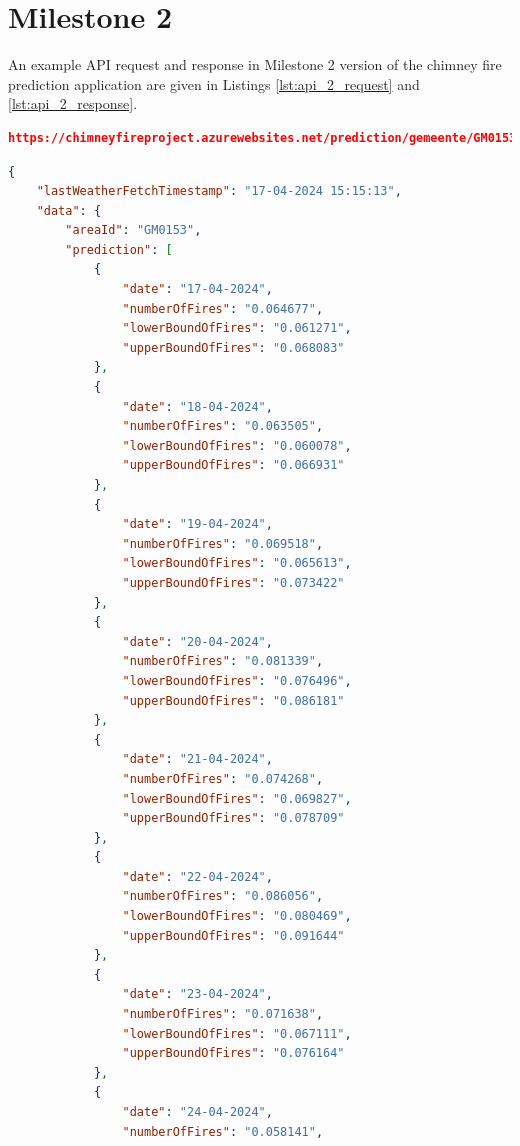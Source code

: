 \documentclass{utitcphd_overleaf}
\begin{document}
\section{Milestone 2}
\label{section:appendix_milestone_2}

An example API request and response in Milestone 2 version of the chimney fire prediction application are given in Listings \ref{lst:api_2_request} and \ref{lst:api_2_response}.

\begin{lstlisting}[label={lst:api_2_request}, language=json, caption=Example API Request in Milestone 2, numbers=none]
https://chimneyfireproject.azurewebsites.net/prediction/gemeente/GM0153
\end{lstlisting}

\begin{lstlisting}[label={lst:api_2_response}, language=json, caption=Example API Response in Milestone 2]
{
    "lastWeatherFetchTimestamp": "17-04-2024 15:15:13",
    "data": {
        "areaId": "GM0153",
        "prediction": [
            {
                "date": "17-04-2024",
                "numberOfFires": "0.064677",
                "lowerBoundOfFires": "0.061271",
                "upperBoundOfFires": "0.068083"
            },
            {
                "date": "18-04-2024",
                "numberOfFires": "0.063505",
                "lowerBoundOfFires": "0.060078",
                "upperBoundOfFires": "0.066931"
            },
            {
                "date": "19-04-2024",
                "numberOfFires": "0.069518",
                "lowerBoundOfFires": "0.065613",
                "upperBoundOfFires": "0.073422"
            },
            {
                "date": "20-04-2024",
                "numberOfFires": "0.081339",
                "lowerBoundOfFires": "0.076496",
                "upperBoundOfFires": "0.086181"
            },
            {
                "date": "21-04-2024",
                "numberOfFires": "0.074268",
                "lowerBoundOfFires": "0.069827",
                "upperBoundOfFires": "0.078709"
            },
            {
                "date": "22-04-2024",
                "numberOfFires": "0.086056",
                "lowerBoundOfFires": "0.080469",
                "upperBoundOfFires": "0.091644"
            },
            {
                "date": "23-04-2024",
                "numberOfFires": "0.071638",
                "lowerBoundOfFires": "0.067111",
                "upperBoundOfFires": "0.076164"
            },
            {
                "date": "24-04-2024",
                "numberOfFires": "0.058141",

\end{lstlisting}
\end{document}
